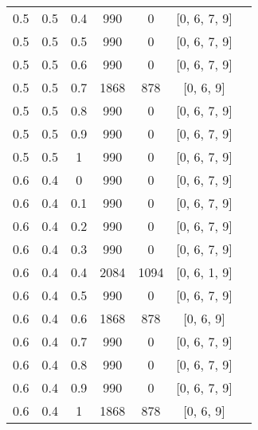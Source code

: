 \begin{table}[H]
\begin{center}
\begin{tabular}{|c@{\hspace{7mm}}|c@{\hspace{7mm}}|c@{\hspace{7mm}}|c@{\hspace{7mm}}|c@{\hspace{7mm}}|c@{\hspace{7mm}}|c|}
0.5  & 0.5  & 0.4  & 990   & 0     & [0, 6, 7, 9]\\
0.5  & 0.5  & 0.5  & 990   & 0     & [0, 6, 7, 9]\\
0.5  & 0.5  & 0.6  & 990   & 0     & [0, 6, 7, 9]\\
0.5  & 0.5  & 0.7  & 1868  & 878   & [0, 6, 9]\\
0.5  & 0.5  & 0.8  & 990   & 0     & [0, 6, 7, 9]\\
0.5  & 0.5  & 0.9  & 990   & 0     & [0, 6, 7, 9]\\
0.5  & 0.5  & 1    & 990   & 0     & [0, 6, 7, 9]\\
0.6  & 0.4  & 0    & 990   & 0     & [0, 6, 7, 9]\\
0.6  & 0.4  & 0.1  & 990   & 0     & [0, 6, 7, 9]\\
0.6  & 0.4  & 0.2  & 990   & 0     & [0, 6, 7, 9]\\
0.6  & 0.4  & 0.3  & 990   & 0     & [0, 6, 7, 9]\\
0.6  & 0.4  & 0.4  & 2084  & 1094  & [0, 6, 1, 9]\\
0.6  & 0.4  & 0.5  & 990   & 0     & [0, 6, 7, 9]\\
0.6  & 0.4  & 0.6  & 1868  & 878   & [0, 6, 9]\\
0.6  & 0.4  & 0.7  & 990   & 0     & [0, 6, 7, 9]\\
0.6  & 0.4  & 0.8  & 990   & 0     & [0, 6, 7, 9]\\
0.6  & 0.4  & 0.9  & 990   & 0     & [0, 6, 7, 9]\\
0.6  & 0.4  & 1    & 1868  & 878   & [0, 6, 9]\\
			\hline
	\end{tabular}

\end{center}

\end{table}


